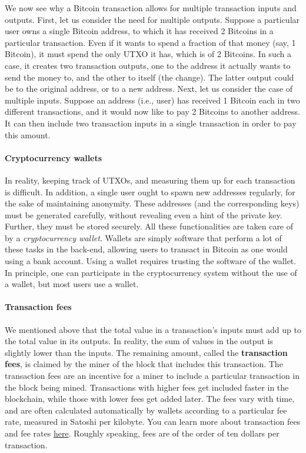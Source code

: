 \documentclass{article}
\begin{document}
We now see why a Bitcoin transaction allows for multiple transaction inputs and outputs. First, let us consider the need for multiple outputs. Suppose a particular user owns a single Bitcoin address, to which it has received 2 Bitcoins in a particular transaction. Even if it wants to spend a fraction of that money (say, 1 Bitcoin), it must spend the only UTXO it has, which is of 2 Bitcoins. In such a case, it creates two transaction outputs, one to the address it actually wants to send the money to, and the other to itself (the change). The latter output could be to the original address, or to a new address. Next, let us consider the case of multiple inputs. Suppose an address (i.e., user) has received 1 Bitcoin each in two different transactions, and it would now like to pay 2 Bitcoins to another address. It can then include two transaction inputs in a single transaction in order to pay this amount.

\paragraph{Cryptocurrency wallets} In reality, keeping track of UTXOs, and measuring them up for each transaction is difficult. In addition, a single user ought to spawn new addresses regularly, for the sake of maintaining anonymity. These addresses (and the corresponding keys) must be generated carefully, without revealing even a hint of the private key. Further, they must be stored securely. All these functionalities are taken care of by a \textit{cryptocurrency wallet}. Wallets are simply software that perform a lot of these tasks in the back-end, allowing users to transact in Bitcoin as one would using a bank account. Using a wallet requires trusting the software of the wallet. In principle, one can participate in the cryptocurrency system without the use of a wallet, but most users use a wallet.

\paragraph{Transaction fees} We mentioned above that the total value in a transaction's inputs must add up to the total value in its outputs. In reality, the sum of values in the output is slightly lower than the inputs. The remaining amount, called the \textbf{transaction fees}, is claimed by the miner of the block that includes this transaction. The transaction fees are an incentive for a miner to include a particular transaction in the block being mined. Transactions with higher fees get included faster in the blockchain, while those with lower fees get added later. The fees vary with time, and are often calculated automatically by wallets according to a  particular fee rate, measured in Satoshi per kilobyte. You can learn more about transaction fees and fee rates  \href{https://en.bitcoin.it/wiki/Miner_fees}{here}. Roughly speaking, fees are of the order of ten dollars per transaction.
\end{document}
